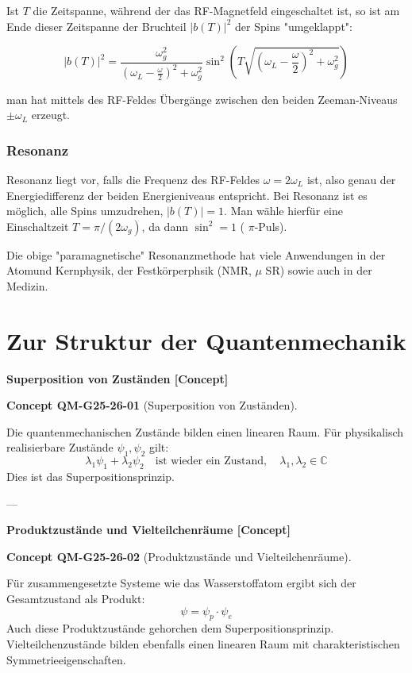 \documentclass[10pt, letterpaper]{article}
\newcommand{\CustomHeading}[3]{%
  \par\medskip\noindent%
  \textbf{#1 #2} \textnormal{(#3)}.\enskip%
}
\newenvironment{CONC}[2]{\begin{unitbox}\CustomHeading{Concept}{#1}{#2}}{\end{unitbox}}
\begin{document}
Ist $T$ die Zeitspanne, während der das RF-Magnetfeld eingeschaltet ist, so ist am Ende dieser Zeitspanne der Bruchteil $|b(T)|^{2}$ der Spins "umgeklappt":

$$
|b(T)|^{2}=\frac{\omega_{g}^{2}}{\left(\omega_{L}-\frac{\omega}{2}\right)^{2}+\omega_{g}^{2}} \sin ^{2}\left(T \sqrt{\left(\omega_{L}-\frac{\omega}{2}\right)^{2}+\omega_{g}^{2}}\right)
$$

man hat mittels des RF-Feldes Übergänge zwischen den beiden Zeeman-Niveaus $\pm \omega_{L}$ erzeugt.

\subsubsection*{Resonanz}
Resonanz liegt vor, falls die Frequenz des RF-Feldes $\omega=2 \omega_{L}$ ist, also genau der Energiedifferenz der beiden Energieniveaus entspricht. Bei Resonanz ist es möglich, alle Spins umzudrehen, $|b(T)|=1$. Man wähle hierfür eine Einschaltzeit $T=\pi /\left(2 \omega_{g}\right)$, da dann $\sin ^{2}=1$ ( $\pi$-Puls).

Die obige "paramagnetische" Resonanzmethode hat viele Anwendungen in der Atomund Kernphysik, der Festkörperphsik (NMR, $\mu$ SR) sowie auch in der Medizin.



\pagebreak

\section{Zur Struktur der Quantenmechanik}

\textbf{Superposition von Zuständen [Concept]}

\begin{CONC}{QM-G25-26-01}{Superposition von Zuständen}
Die quantenmechanischen Zustände bilden einen linearen Raum. Für physikalisch realisierbare Zustände $\psi_1, \psi_2$ gilt:
\[
\lambda_1 \psi_1 + \lambda_2 \psi_2 \quad \text{ist wieder ein Zustand}, \quad \lambda_1, \lambda_2 \in \mathbb{C}
\]
Dies ist das Superpositionsprinzip.
\end{CONC}

---

\textbf{Produktzustände und Vielteilchenräume [Concept]}

\begin{CONC}{QM-G25-26-02}{Produktzustände und Vielteilchenräume}
Für zusammengesetzte Systeme wie das Wasserstoffatom ergibt sich der Gesamtzustand als Produkt:
\[
\psi = \psi_p \cdot \psi_e
\]
Auch diese Produktzustände gehorchen dem Superpositionsprinzip. Vielteilchenzustände bilden ebenfalls einen linearen Raum mit charakteristischen Symmetrieeigenschaften.
\end{CONC}
\end{document}
